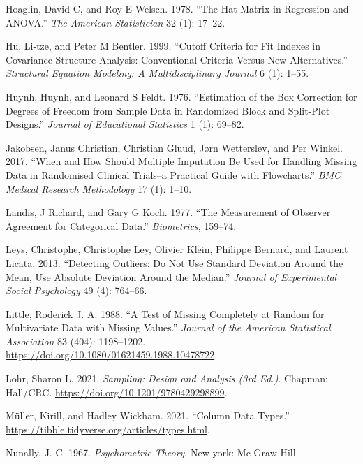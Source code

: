 \documentclass[
  letterpaper,
  DIV=11,
  numbers=noendperiod]{scrreprt}
\newlength{\cslhangindent}
\newenvironment{CSLReferences}[2] %
 {\begin{list}{}{%
  \setlength{\itemindent}{0pt}
  \setlength{\leftmargin}{0pt}
  \setlength{\parsep}{0pt}
  \ifodd #1
   \setlength{\leftmargin}{\cslhangindent}
   \setlength{\itemindent}{-1\cslhangindent}
  \fi
  \setlength{\itemsep}{#2\baselineskip}}}
 {\end{list}}
\begin{document}
\begin{CSLReferences}{1}{0}
Hoaglin, David C, and Roy E Welsch. 1978. {``The Hat Matrix in
Regression and ANOVA.''} \emph{The American Statistician} 32 (1):
17--22.

Hu, Li-tze, and Peter M Bentler. 1999. {``Cutoff Criteria for Fit
Indexes in Covariance Structure Analysis: Conventional Criteria Versus
New Alternatives.''} \emph{Structural Equation Modeling: A
Multidisciplinary Journal} 6 (1): 1--55.

Huynh, Huynh, and Leonard S Feldt. 1976. {``Estimation of the Box
Correction for Degrees of Freedom from Sample Data in Randomized Block
and Split-Plot Designs.''} \emph{Journal of Educational Statistics} 1
(1): 69--82.

Jakobsen, Janus Christian, Christian Gluud, Jørn Wetterslev, and Per
Winkel. 2017. {``When and How Should Multiple Imputation Be Used for
Handling Missing Data in Randomised Clinical Trials--a Practical Guide
with Flowcharts.''} \emph{BMC Medical Research Methodology} 17 (1):
1--10.

Landis, J Richard, and Gary G Koch. 1977. {``The Measurement of Observer
Agreement for Categorical Data.''} \emph{Biometrics}, 159--74.

Leys, Christophe, Christophe Ley, Olivier Klein, Philippe Bernard, and
Laurent Licata. 2013. {``Detecting Outliers: Do Not Use Standard
Deviation Around the Mean, Use Absolute Deviation Around the Median.''}
\emph{Journal of Experimental Social Psychology} 49 (4): 764--66.

Little, Roderick J. A. 1988. {``A Test of Missing Completely at Random
for Multivariate Data with Missing Values.''} \emph{Journal of the
American Statistical Association} 83 (404): 1198--1202.
\url{https://doi.org/10.1080/01621459.1988.10478722}.

Lohr, Sharon L. 2021. \emph{Sampling: Design and Analysis (3rd Ed.)}.
Chapman; Hall/CRC. \url{https://doi.org/10.1201/9780429298899}.

Müller, Kirill, and Hadley Wickham. 2021. {``Column Data Types.''}
\url{https://tibble.tidyverse.org/articles/types.html}.

Nunally, J. C. 1967. \emph{Psychometric Theory}. New york: Mc Graw-Hill.


\end{CSLReferences}
\end{document}
